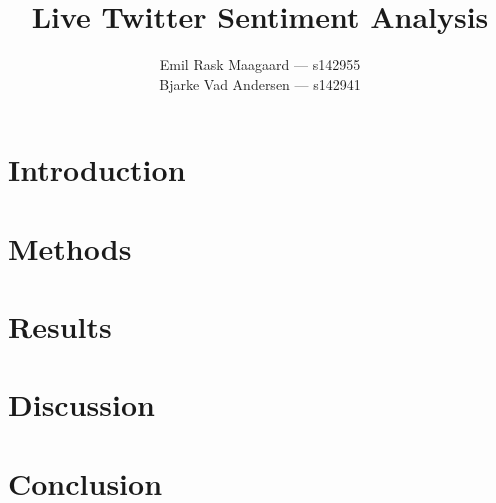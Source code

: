 \documentclass{dtu_report_columns}
\title{Live Twitter Sentiment Analysis}
\author{Emil Rask Maagaard --- s142955\\Bjarke Vad Andersen --- s142941}
\begin{document}
\maketitle{}




\section{Introduction}


\section{Methods}


\section{Results}


\section{Discussion}


\section{Conclusion}





% 
\end{document}
